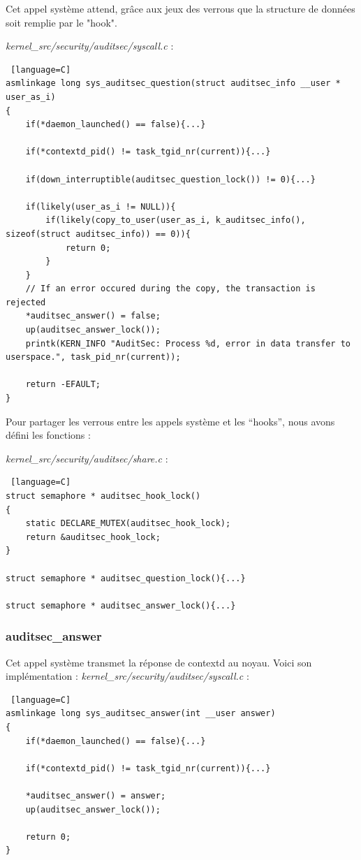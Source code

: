 \documentclass[pdftex,a4paper,titlepage,11pt]{article}
\begin{document}
Cet appel système attend, grâce aux jeux des verrous que la structure de données soit remplie par le "hook".

\textit{{kernel\_src}/security/auditsec/syscall.c} :
\begin{lstlisting} [language=C]
asmlinkage long sys_auditsec_question(struct auditsec_info __user * user_as_i)
{
	if(*daemon_launched() == false){...}

	if(*contextd_pid() != task_tgid_nr(current)){...}

	if(down_interruptible(auditsec_question_lock()) != 0){...}

	if(likely(user_as_i != NULL)){
		if(likely(copy_to_user(user_as_i, k_auditsec_info(), sizeof(struct auditsec_info)) == 0)){
			return 0;
		}
	}
	// If an error occured during the copy, the transaction is rejected
	*auditsec_answer() = false;
	up(auditsec_answer_lock());
	printk(KERN_INFO "AuditSec: Process %d, error in data transfer to userspace.", task_pid_nr(current));

	return -EFAULT;
}
\end{lstlisting}

Pour partager les verrous entre les appels système et les ``hooks'', nous avons défini les fonctions :

\textit{{kernel\_src}/security/auditsec/share.c} :
\begin{lstlisting} [language=C]
struct semaphore * auditsec_hook_lock()
{
	static DECLARE_MUTEX(auditsec_hook_lock);
	return &auditsec_hook_lock;
}

struct semaphore * auditsec_question_lock(){...}

struct semaphore * auditsec_answer_lock(){...}
\end{lstlisting}

\subsubsection{auditsec\_answer}

Cet appel système transmet la réponse de contextd au noyau. Voici son implémentation :
\textit{{kernel\_src}/security/auditsec/syscall.c} :
\begin{lstlisting} [language=C]
asmlinkage long sys_auditsec_answer(int __user answer)
{
	if(*daemon_launched() == false){...}

	if(*contextd_pid() != task_tgid_nr(current)){...}

	*auditsec_answer() = answer;
	up(auditsec_answer_lock());

	return 0;
}
\end{lstlisting}
\end{document}
